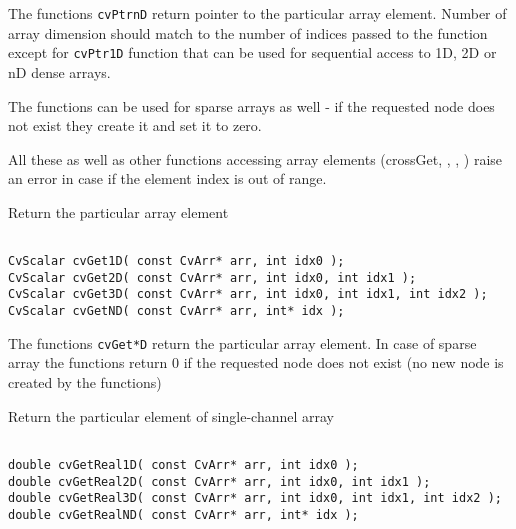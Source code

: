 The functions \texttt{cvPtrnD} return pointer to the particular array element. Number of array dimension should match to the number of indices passed to the function except for \texttt{cvPtr1D} function that can be used for sequential access to 1D, 2D or nD dense arrays.

The functions can be used for sparse arrays as well - if the requested node does not exist they create it and set it to zero.

All these as well as other functions accessing array elements (cross{Get}, , , ) raise an error in case if the element index is out of range.


Return the particular array element

\begin{lstlisting}

CvScalar cvGet1D( const CvArr* arr, int idx0 );
CvScalar cvGet2D( const CvArr* arr, int idx0, int idx1 );
CvScalar cvGet3D( const CvArr* arr, int idx0, int idx1, int idx2 );
CvScalar cvGetND( const CvArr* arr, int* idx );

\end{lstlisting}

\begin{description}
\end{description}


The functions \texttt{cvGet*D} return the particular array element. In case of sparse array the functions return 0 if the requested node does not exist (no new node is created by the functions)


Return the particular element of single-channel array

\begin{lstlisting}

double cvGetReal1D( const CvArr* arr, int idx0 );
double cvGetReal2D( const CvArr* arr, int idx0, int idx1 );
double cvGetReal3D( const CvArr* arr, int idx0, int idx1, int idx2 );
double cvGetRealND( const CvArr* arr, int* idx );

\end{lstlisting}

\begin{description}
\end{description}


